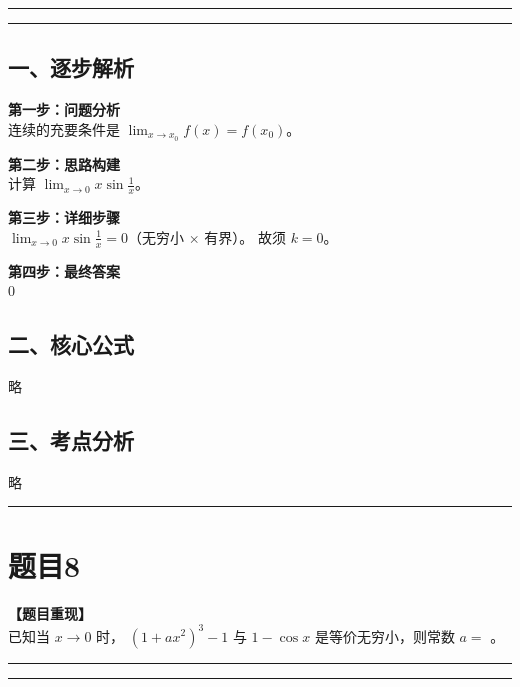 \documentclass[12pt, a4paper]{ctexart}
\newcommand{\TopSeparator}{
    \par\noindent\rule{\textwidth}{1.5pt}\vspace{0.5em} %
}
\newcommand{\AnalysisSeparator}{
    \par\noindent\rule{\textwidth}{0.5pt}\vspace{0.2em}\hrule\vspace{0.5em} %
}
\newenvironment{RedAnalysis}{
    \par
    \color{red} %
}{
    \par
    \color{black} %
}
\begin{document}
\AnalysisSeparator

\begin{RedAnalysis}

\subsection*{一、逐步解析}

\textbf{第一步：问题分析} \\
连续的充要条件是 $\lim_{x\to x_0} f(x) = f(x_0)$。

\textbf{第二步：思路构建} \\
计算 $\lim_{x\to 0} x\sin\frac{1}{x}$。

\textbf{第三步：详细步骤} \\
$\lim_{x\to 0} x\sin\frac{1}{x} = 0$（无穷小 $\times$ 有界）。
故须 $k=0$。

\textbf{第四步：最终答案} \\
0

\subsection*{二、核心公式}
略

\subsection*{三、考点分析}
略

\end{RedAnalysis}

\vspace{2em}

\TopSeparator
\section*{题目8}

\textbf{【题目重现】} \\
已知当 $ x \to 0 $ 时， $ (1 + ax^{2})^{3} - 1 $ 与 $ 1 - \cos x $ 是等价无穷小，则常数 $ a = $ \underline{\hspace{2cm}}。

\AnalysisSeparator
\end{document}
